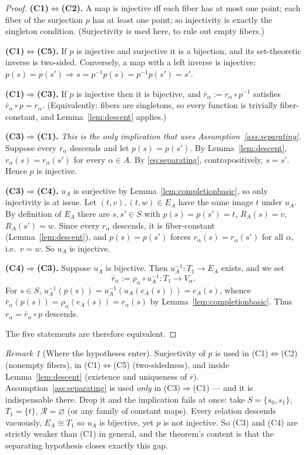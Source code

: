 \documentclass[11pt,reqno]{amsart}
\theoremstyle{plain}
\theoremstyle{definition}
\theoremstyle{remark}
\newtheorem{remark}[theorem]{Remark}
\begin{document}
\begin{proof}
\textbf{(C1)$\Leftrightarrow$(C2).} A map is injective iff each fiber has at most one point; each fiber of the surjection $p$ has at least one point; so injectivity is exactly the singleton condition. (Surjectivity is used here, to rule out empty fibers.)

\textbf{(C1)$\Leftrightarrow$(C5).} If $p$ is injective and surjective it is a bijection, and its set-theoretic inverse is two-sided. Conversely, a map with a left inverse is injective: $p(s)=p(s')\Rightarrow s=p^{-1}p(s)=p^{-1}p(s')=s'$.

\textbf{(C1)$\Rightarrow$(C3).} If $p$ is injective then it is bijective, and $\bar r_\alpha:=r_\alpha\circ p^{-1}$ satisfies $\bar r_\alpha\circ p=r_\alpha$. (Equivalently: fibers are singletons, so every function is trivially fiber-constant, and Lemma~\ref{lem:descent} applies.)

\textbf{(C3)$\Rightarrow$(C1).} \emph{This is the only implication that uses Assumption~\ref{ass:separating}.} Suppose every $r_\alpha$ descends and let $p(s)=p(s')$. By Lemma~\ref{lem:descent}, $r_\alpha(s)=r_\alpha(s')$ for every $\alpha\in A$. By \eqref{eq:separating}, contrapositively, $s=s'$. Hence $p$ is injective.

\textbf{(C3)$\Rightarrow$(C4).} $u_A$ is surjective by Lemma~\ref{lem:completionbasic}, so only injectivity is at issue. Let $(t,v),(t,w)\in E_A$ have the same image $t$ under $u_A$. By definition of $E_A$ there are $s,s'\in S$ with $p(s)=p(s')=t$, $R_A(s)=v$, $R_A(s')=w$. Since every $r_\alpha$ descends, it is fiber-constant (Lemma~\ref{lem:descent}), and $p(s)=p(s')$ forces $r_\alpha(s)=r_\alpha(s')$ for all $\alpha$, i.e.\ $v=w$. So $u_A$ is injective.

\textbf{(C4)$\Rightarrow$(C3).} Suppose $u_A$ is bijective. Then $u_A^{-1}\colon T_1\to E_A$ exists, and we set
\[
\bar r_\alpha:=\rho_\alpha\circ u_A^{-1}\colon T_1\longrightarrow V_\alpha .
\]
For $s\in S$, $u_A^{-1}(p(s))=u_A^{-1}(u_A(e_A(s)))=e_A(s)$, whence
$\bar r_\alpha(p(s))=\rho_\alpha(e_A(s))=r_\alpha(s)$ by Lemma~\ref{lem:completionbasic}. Thus $r_\alpha=\bar r_\alpha\circ p$ descends.

The five statements are therefore equivalent.
\end{proof}

\begin{remark}[Where the hypotheses enter]\label{rem:hypotheses}
Surjectivity of $p$ is used in (C1)$\Leftrightarrow$(C2) (nonempty fibers), in (C1)$\Leftrightarrow$(C5) (two-sidedness), and inside Lemma~\ref{lem:descent} (existence and uniqueness of $\bar r$). Assumption~\ref{ass:separating} is used \emph{only} in (C3)$\Rightarrow$(C1) --- and it is indispensable there. Drop it and the implication fails at once: take $S=\{s_0,s_1\}$, $T_1=\{t\}$, $\mathcal R=\varnothing$ (or any family of constant maps). Every relation descends vacuously, $E_A\cong T_1$ so $u_A$ is bijective, yet $p$ is not injective. So (C3) and (C4) are strictly weaker than (C1) in general, and the theorem's content is that the separating hypothesis closes exactly this gap.
\end{remark}
\end{document}
